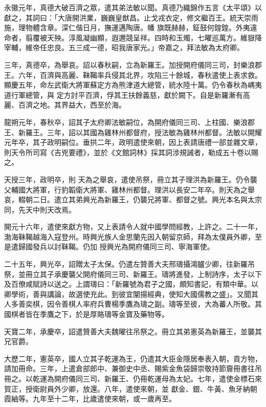 \begin{pinyinscope}
 永徽元年，真德大破百濟之眾，遣其弟法敏以聞。真德乃織錦作五言《太平頌》以獻之，其詞曰：「大唐開洪業，巍巍皇猷昌。止戈戎衣定，修文繼百王。統天崇雨施，理物體含章。深仁偕日月，撫運邁陶唐。幡
 旗既赫赫，鉦鼓何鍠鍠。外夷違命者，翦覆被天殃。淳風凝幽顯，遐邇競呈祥。四時和玉燭，七曜巡萬方。維嶽降宰輔，維帝任忠良。五三成一德，昭我唐家光。」帝嘉之，拜法敏為太府卿。



 三年，真德卒，為舉哀。詔以春秋嗣，立為新羅王。加授開府儀同三司，封樂浪郡王。六年，百濟與高麗、靺鞨率兵侵其北界，攻陷三十餘城，春秋遣使上表求救。顯慶五年，命左武衛大將軍蘇定方為熊津道大總管，統水陸十萬。仍令春秋為嵎夷道行軍總管，與
 定方討平百濟，俘其王扶餘義慈，獻於闕下。自是新羅漸有高麗、百濟之地。其界益大，西至於海。



 龍朔元年，春秋卒，詔其子太府卿法敏嗣位，為開府儀同三司、上柱國、樂浪郡王、新羅王。三年，詔以其國為雞林州都督府，授法敏為雞林州都督。法敏以開耀元年卒，其子政明嗣位。垂拱二年，政明遣使來朝，因上表請唐禮一部並雜文章，則天令所司寫《吉兇要禮》，並於《文館詞林》採其詞涉規誡者，勒成五十卷以賜之。



 天授三年，政明卒，則
 天為之舉哀，遣使吊祭，冊立其子理洪為新羅王。仍令襲父輔國大將軍，行豹韜衛大將軍、雞林州都督。理洪以長安二年卒。則天為之舉哀，輟朝二日。遣立其弟興光為新羅王，仍襲兄將軍、都督之號。興光本名與太宗同，先天中則天改焉。



 開元十六年，遣使來獻方物，又上表請令人就中國學問經教，上許之。二十一年，渤海靺鞨越海入寇登州。時興光族人金思蘭先因入朝留京師，拜為太僕員外卿，至是遣歸國發兵以討靺鞨。仍加
 授興光為開府儀同三司、寧海軍使。



 二十五年，興光卒，詔贈太子太保。仍遣左贊善大夫邢璹攝鴻臚少卿，往新羅吊祭，並冊立其子承慶襲父開府儀同三司、新羅王。璹將進發，上制詩序，太子以下及百僚咸賦詩以送之。上謂璹曰：「新羅號為君子之國，頗知書記，有類中華。以卿學術，善與講論，故選使充此。到彼宜闡揚經典，使知大國儒教之盛」。又聞其人多善奕棋，因令善棋人率府兵曹楊季鷹為璹之副。璹等至彼，大為蕃人所敬。其
 國棋者皆在季鷹之下，於是厚賂璹等金寶及藥物等。



 天寶二年，承慶卒，詔遣贊善大夫魏曜往吊祭之。冊立其弟憲英為新羅王，並襲其兄官爵。



 大歷二年，憲英卒，國人立其子乾運為王，仍遣其大臣金隱居奉表入朝，貢方物，請加冊命。三年，上遣倉部郎中、兼御史中丞、賜紫金魚袋歸崇敬持節齎冊書往吊冊之。以乾運為開府儀同三司、新羅王、仍冊乾運母為太妃。七年，遣使金標石來賀正，授衛尉員外少卿，放還。八年，遣使來朝，並
 獻金、銀、牛黃、魚牙納朝霞紬等。九年至十二年，比歲遣使來朝，或一歲再至。




\end{pinyinscope}
